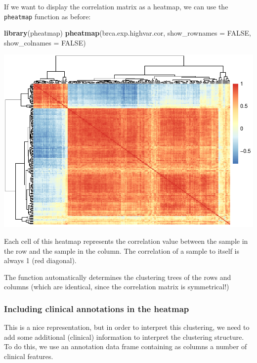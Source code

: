 \documentclass[
]{book}
\newenvironment{Shaded}{\begin{snugshade}}{\end{snugshade}}
\newcommand{\AttributeTok}[1]{\textcolor[rgb]{0.13,0.29,0.53}{#1}}
\newcommand{\ConstantTok}[1]{\textcolor[rgb]{0.56,0.35,0.01}{#1}}
\newcommand{\FunctionTok}[1]{\textcolor[rgb]{0.13,0.29,0.53}{\textbf{#1}}}
\newcommand{\NormalTok}[1]{#1}
\begin{document}
If we want to display the correlation matrix as a heatmap, we can use the \texttt{pheatmap} function as before:

\begin{Shaded}
\begin{Highlighting}[]
\FunctionTok{library}\NormalTok{(pheatmap)}
\FunctionTok{pheatmap}\NormalTok{(brca.exp.highvar.cor, }
         \AttributeTok{show\_rownames =} \ConstantTok{FALSE}\NormalTok{, }
         \AttributeTok{show\_colnames =} \ConstantTok{FALSE}\NormalTok{)}
\end{Highlighting}
\end{Shaded}

\includegraphics{_main_files/figure-latex/unnamed-chunk-79-1.pdf}

Each cell of this heatmap represents the correlation value between the sample in the row and the sample in the column. The correlation of a sample to itself is always 1 (red diagonal).

The function automatically determines the clustering trees of the rows and columns (which are identical, since the correlation matrix is symmetrical!)

\hypertarget{including-clinical-annotations-in-the-heatmap}{%
\subsubsection{Including clinical annotations in the heatmap}\label{including-clinical-annotations-in-the-heatmap}}

This is a nice representation, but in order to interpret this clustering, we need to add some additional (clinical) information to interpret the clustering structure. To do this, we use an annotation data frame containing as columns a number of clinical features.
\end{document}
